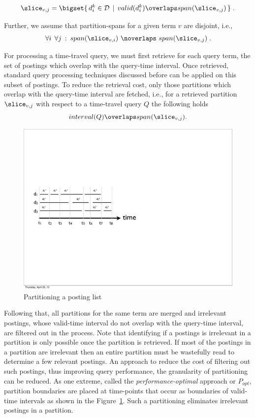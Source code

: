 \begin{equation*}
  \slice_{v,j} = \bigset{ \, d_i^k \in \mathcal{D}\:\:|\:\: valid(d_i^k) \overlaps span(\slice_{v,j})\,} \;.
\end{equation*}

Further, we assume that partition-spans for a given term $v$ are disjoint, i.e.,
\begin{equation*}
  \forall{i}\:\:\forall{j}\::\: span(\slice_{v,i})\,\, \noverlaps \,\,span(\slice_{v,j})\;.
\end{equation*}

For processing a time-travel query, we must first retrieve for each query term, the set of postings which overlap with the query-time interval. Once retrieved, standard query processing techniques discussed before can be applied on this subset of postings. To reduce the retrieval cost, only those partitions which overlap with the query-time interval are fetched, i.e., for a retrieved partition $\slice_{v,j}$ with respect to a time-travel query $Q$ the following holds
$$
	 interval(Q) \overlaps span(\slice_{v,j}).
$$

\begin{figure}[tb]
  \centering
    \includegraphics[width=0.7\columnwidth]{resources/popt.pdf}
  \caption{Partitioning a posting list} 
    \label{fig:part_strat}
\end{figure}

Following that, all partitions for the same term are merged and irrelevant postings, whose valid-time interval do not overlap with the query-time interval, are filtered out in the process. Note that identifying if a  postings is irrelevant in a partition is only possible once the partition is retrieved. If most of the postings in a partition are irrelevant then an entire partition must be wastefully read to determine a few relevant postings. An approach to reduce the cost of filtering out such postings, thus improving query performance, the granularity of partitioning can be reduced. As one extreme, called the \emph{performance-optimal} approach or $P_{opt}$, partition boundaries are placed at time-points that occur as boundaries of valid-time intervals as shown in the Figure~\ref{fig:part_strat}. Such a partitioning eliminates irrelevant postings in a partition.  

